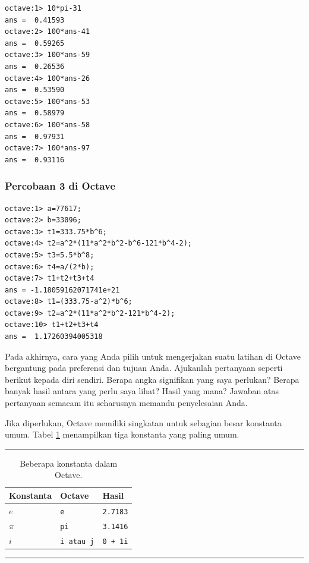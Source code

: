 \begin{verbatim}
octave:1> 10*pi-31
ans =  0.41593
octave:2> 100*ans-41
ans =  0.59265
octave:3> 100*ans-59
ans =  0.26536
octave:4> 100*ans-26
ans =  0.53590
octave:5> 100*ans-53
ans =  0.58979
octave:6> 100*ans-58
ans =  0.97931
octave:7> 100*ans-97
ans =  0.93116 
\end{verbatim}

\subsubsection{Percobaan 3 di Octave}

\begin{verbatim}
octave:1> a=77617;
octave:2> b=33096;
octave:3> t1=333.75*b^6;
octave:4> t2=a^2*(11*a^2*b^2-b^6-121*b^4-2);
octave:5> t3=5.5*b^8;
octave:6> t4=a/(2*b);
octave:7> t1+t2+t3+t4
ans = -1.18059162071741e+21
octave:8> t1=(333.75-a^2)*b^6;
octave:9> t2=a^2*(11*a^2*b^2-121*b^4-2);
octave:10> t1+t2+t3+t4
ans =  1.17260394005318 
\end{verbatim}

\noindent Pada akhirnya, cara yang Anda pilih untuk mengerjakan suatu
latihan di Octave bergantung pada preferensi dan tujuan Anda. Ajukanlah
pertanyaan seperti berikut kepada diri sendiri. Berapa angka signifikan
yang saya perlukan? Berapa banyak hasil antara yang perlu saya lihat?
Hasil yang mana? Jawaban atas pertanyaan semacam itu seharusnya memandu
penyelesaian Anda.

Jika diperlukan, Octave memiliki singkatan untuk sebagian besar konstanta
umum. Tabel \ref{tab:constants} menampilkan tiga konstanta yang paling
umum.
\begin{table}[h]
\hrule \caption{\label{tab:constants}Beberapa konstanta 
dalam Octave.}

\medskip{}

\centering{}%
\begin{tabular}{lll}
Konstanta & Octave & Hasil\tabularnewline
\hline 
$e$ & \texttt{e} & \texttt{2.7183}\tabularnewline
$\pi$ & \texttt{pi} & \texttt{3.1416}\tabularnewline
$i$ & \texttt{i atau j} & \texttt{0 + 1i}\tabularnewline
\end{tabular}\medskip{}
\hrule 
\end{table}

\noindent\startexercises

